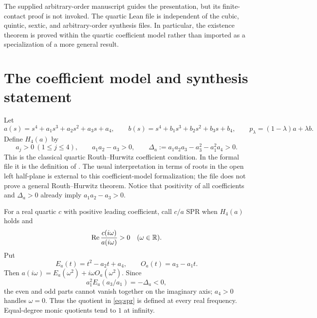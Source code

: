 \documentclass[11pt]{article}
\begin{document}
The supplied arbitrary-order manuscript \cite{referenceDraft} guides the presentation, but its finite-contact proof is not invoked. The quartic Lean file is independent of the cubic, quintic, sextic, and arbitrary-order synthesis files. In particular, the existence theorem is proved within the quartic coefficient model rather than imported as a specialization of a more general result.

\section{The coefficient model and synthesis statement}
Let
\[
 a(s)=s^4+a_1s^3+a_2s^2+a_3s+a_4,\qquad
 b(s)=s^4+b_1s^3+b_2s^2+b_3s+b_4,
 \qquad p_\lambda=(1-\lambda)a+\lambda b.
\]
Define $H_4(a)$ by
\begin{equation}\label{eq:rh}
 a_j>0\ (1\le j\le4),\qquad a_1a_2-a_3>0,\qquad
 \Delta_a:=a_1a_2a_3-a_3^2-a_1^2a_4>0.
\end{equation}
This is the classical quartic Routh--Hurwitz coefficient condition. In the formal file it is the definition of . The usual interpretation in terms of roots in the open left half-plane is external to this coefficient-model formalization; the file does not prove a general Routh--Hurwitz theorem. Notice that positivity of all coefficients and $\Delta_a>0$ already imply $a_1a_2-a_3>0$.

For a real quartic $c$ with positive leading coefficient, call $c/a$ SPR when $H_4(a)$ holds and
\begin{equation}\label{eq:spr}
 \operatorname{Re}\frac{c(i\omega)}{a(i\omega)}>0\quad(\omega\in\mathbb R).
\end{equation}
Put
\[
 E_a(t)=t^2-a_2t+a_4,\qquad O_a(t)=a_3-a_1t.
\]
Then $a(i\omega)=E_a(\omega^2)+i\omega O_a(\omega^2)$. Since
\begin{equation}\label{eq:pivot}
 a_1^2E_a(a_3/a_1)=-\Delta_a<0,
\end{equation}
the even and odd parts cannot vanish together on the imaginary axis; $a_4>0$ handles $\omega=0$. Thus the quotient in \eqref{eq:spr} is defined at every real frequency. Equal-degree monic quotients tend to $1$ at infinity.
\end{document}
